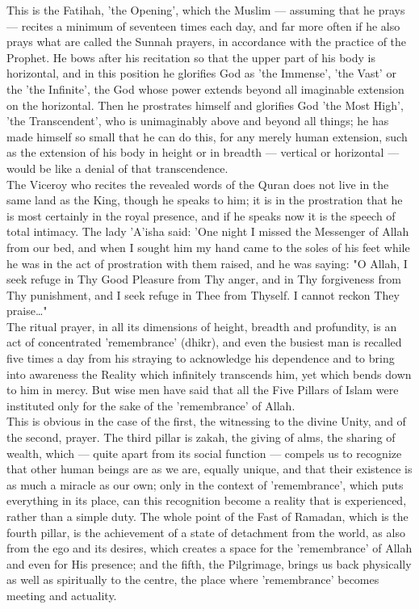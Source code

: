 \documentclass[11pt, b5paper, twoside]{book}
\begin{document}
This is the Fatihah, 'the Opening', which the Muslim --- assuming that he prays --- recites a minimum of 
seventeen times each day, and far more often if he also prays what are called the Sunnah prayers, in 
accordance with the practice of the Prophet. He bows after his recitation so that the upper part of 
his body is horizontal, and in this position he glorifies God as 'the Immense', 'the Vast' or the 
'the Infinite', the God whose power extends beyond all imaginable extension on the horizontal. Then 
he prostrates himself and glorifies God 'the Most High', 'the Transcendent', who is unimaginably 
above and beyond all things; he has made himself so small that he can do this, for any merely human 
extension, such as the extension of his body in height or in breadth --- vertical or horizontal --- would 
be like a denial of that transcendence. \\

The Viceroy who recites the revealed words of the Quran does not live in the same land as the King, 
though he speaks to him; it is in the prostration that he is most certainly in the royal presence, 
and if he speaks now it is the speech of total intimacy. The lady 'A'isha said: 'One night I missed 
the Messenger of Allah from our bed, and when I sought him my hand came to the soles of his feet 
while he was in the act of prostration with them raised, and he was saying: "O Allah, I seek refuge 
in Thy Good Pleasure from Thy anger, and in Thy forgiveness from Thy punishment, and I seek refuge in 
Thee from Thyself. I cannot reckon They praise\ldots{}" \\

The ritual prayer, in all its dimensions of height, breadth and profundity, is an act of concentrated 
'remembrance' (dhikr), and even the busiest man is recalled five times a day from his straying to 
acknowledge his dependence and to bring into awareness the Reality which infinitely transcends him, 
yet which bends down to him in mercy. But wise men have said that all the Five Pillars of Islam were 
instituted only for the sake of the 'remembrance' of Allah. \\

This is obvious in the case of the first, the witnessing to the divine Unity, and of the second, 
prayer. The third pillar is zakah, the giving of alms, the sharing of wealth, which --- quite apart 
from its social function --- compels us to recognize that other human beings are as we are, equally 
unique, and that their existence is as much a miracle as our own; only in the context of 
'remembrance', which puts everything in its place, can this recognition become a reality that is 
experienced, rather than a simple duty. The whole point of the Fast of Ramadan, which is the fourth 
pillar, is the achievement of a state of detachment from the world, as also from the ego and its 
desires, which creates a space for the 'remembrance' of Allah and even for His presence; and the 
fifth, the Pilgrimage, brings us back physically as well as spiritually to the centre, the place 
where 'remembrance' becomes meeting and actuality. \\
\end{document}

